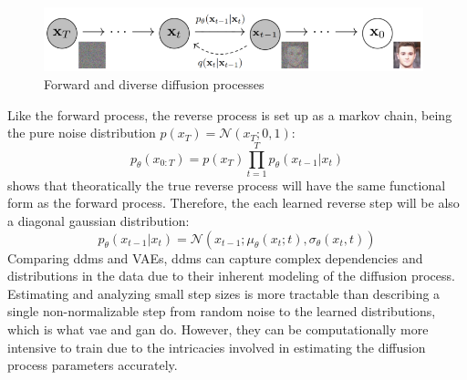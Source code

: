 \documentclass[11pt, a4paper]{article}
\begin{document}
		\begin{figure}[H]
		\centering
		\includegraphics[width=11cm]{imgs/relatedwork/forward-reverse-diffusion}
		\caption{Forward and diverse diffusion processes}
		\label{fig:related-forward-reverse-diffusion}
	\end{figure}
	Like the forward process, the reverse process is set up as a markov chain, being the pure noise distribution $p(x_T) = \mathcal{N}(x_T; 0, 1)$:
	\[p_{\theta}(x_{0:T}) = p(x_T) \prod_{t=1}^{T} p_{\theta}(x_{t-1}| x_t)\]
	\cite{feller1950} shows that theoratically the true reverse process will have the same functional form as the forward process. Therefore, the each learned reverse step will be also a diagonal gaussian distribution:
	\[p_{\theta}(x_{t-1}|x_t) = \mathcal{N}(x_{t-1}; \mu_{\theta}(x_t; t), \sigma_{\theta}(x_t, t))\]
	Comparing \gls{ddm}s and VAEs, \gls{ddm}s can capture complex dependencies and distributions in the data due to their inherent modeling of the diffusion process. Estimating and analyzing small step sizes is more tractable than describing a single non-normalizable step from random noise to the learned distributions, which is what \gls{vae} and \gls{gan} do. However, they can be computationally more intensive to train due to the intricacies involved in estimating the diffusion process parameters accurately.
	
\end{document}
